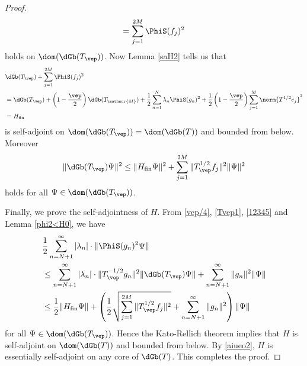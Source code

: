 \documentclass[12pt,draft]{article}
\theoremstyle{plain}
\numberwithin{equation}{section}
\theoremstyle{remark}
\begin{document}
\begin{proof}
\begin{equation*}
= \sum_{j=1}^{2M} \PhiS(f_j)^2
\end{equation*}
holds on $\dom(\dGb(T_\vep))$.
Now Lemma \ref{saH2} tells us that 
\begin{align*}
&\dGb(T_\vep)+\sum_{j=1}^{2M} \PhiS(f_j)^2\\
&=\dGb(T_\vep) + \left(1-\frac{\vep}{2}\right)\dGb(T_\mathscr{M}) + \frac{1}{2}\sum_{n=1}^N \lambda_n \PhiS(g_n)^2 + \frac{1}{2}\left(1-\frac{\vep}{2}\right) \sum_{j=1}^M \norm{T^{1/2}e_j}^2\\
&=H_{\rm fin}
\end{align*}
is self-adjoint on $\dom(\dGb(T_\vep))=\dom(\dGb(T))$ and bounded from below.
Moreover
\begin{equation}\label{12345}
\|\dGb(T_\vep)\Psi\|^2  \leq \|H_{\rm fin}\Psi\|^2 + \sum_{j=1}^{2M}\|T_\vep^{1/2}f_j\|^2\|\Psi\|^2
\end{equation}
holds for all $\Psi\in\dom(\dGb(T_\vep))$.

Finally, we prove the self-adjointness of $H$. 
From \eqref{vep/4}, \eqref{Tvep1}, \eqref{12345} and Lemma \ref{phi2<H0}, we have
\begin{align*}
&\frac{1}{2}\sum_{n=N+1}^\infty|\lambda_n|\cdot\|\PhiS(g_n)^2\Psi\|\\
&\leq \sum_{n=N+1}^\infty|\lambda_n|\cdot\|T_\vep^{-1/2}g_n\|^2\|\dGb(T_\vep)\Psi\| + \sum_{n=N+1}^\infty\|g_n\|^2\|\Psi\|\\
&\leq \frac{1}{2}\|H_{\rm fin}\Psi\| 
+\left(\frac{1}{2}\sqrt{\sum_{j=1}^{2M}\|T_\vep^{1/2}f_j\|^2}+\sum_{n=N+1}^\infty\|g_n\|^2\right)\|\Psi\|
\end{align*}
for all $\Psi\in\dom(\dGb(T_\vep))$.
Hence the Kato-Rellich theorem implies that $H$ is self-adjoint on $\dom(\dGb(T))$ and bounded from below.
By \eqref{aiueo2}, $H$ is essentially self-adjoint on any core of $\dGb(T)$.
This completes the proof.
\end{proof}



\end{document}

